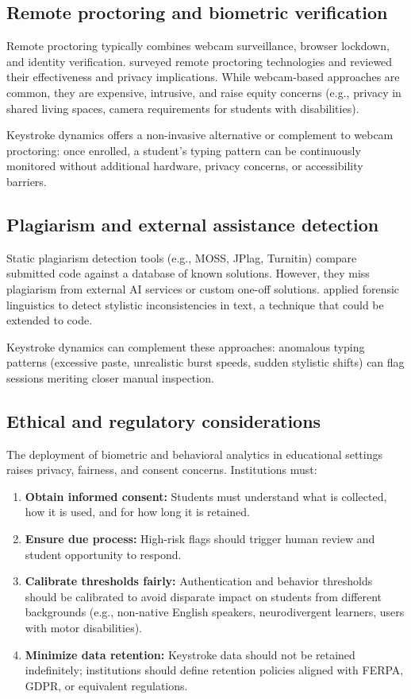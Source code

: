 \subsection{Remote proctoring and biometric verification}

Remote proctoring typically combines webcam surveillance, browser lockdown, and identity verification. \citet{rapchak2020remote} surveyed remote proctoring technologies and reviewed their effectiveness and privacy implications. While webcam-based approaches are common, they are expensive, intrusive, and raise equity concerns (e.g., privacy in shared living spaces, camera requirements for students with disabilities).

Keystroke dynamics offers a non-invasive alternative or complement to webcam proctoring: once enrolled, a student's typing pattern can be continuously monitored without additional hardware, privacy concerns, or accessibility barriers.

\subsection{Plagiarism and external assistance detection}

Static plagiarism detection tools (e.g., MOSS, JPlag, Turnitin) compare submitted code against a database of known solutions. However, they miss plagiarism from external AI services or custom one-off solutions. \citet{chaski2012forensic} applied forensic linguistics to detect stylistic inconsistencies in text, a technique that could be extended to code.

Keystroke dynamics can complement these approaches: anomalous typing patterns (excessive paste, unrealistic burst speeds, sudden stylistic shifts) can flag sessions meriting closer manual inspection.

\subsection{Ethical and regulatory considerations}

The deployment of biometric and behavioral analytics in educational settings raises privacy, fairness, and consent concerns. Institutions must:

\begin{enumerate}
  \item \textbf{Obtain informed consent:} Students must understand what is collected, how it is used, and for how long it is retained.
  \item \textbf{Ensure due process:} High-risk flags should trigger human review and student opportunity to respond.
  \item \textbf{Calibrate thresholds fairly:} Authentication and behavior thresholds should be calibrated to avoid disparate impact on students from different backgrounds (e.g., non-native English speakers, neurodivergent learners, users with motor disabilities).
  \item \textbf{Minimize data retention:} Keystroke data should not be retained indefinitely; institutions should define retention policies aligned with FERPA, GDPR, or equivalent regulations.
\end{enumerate}

